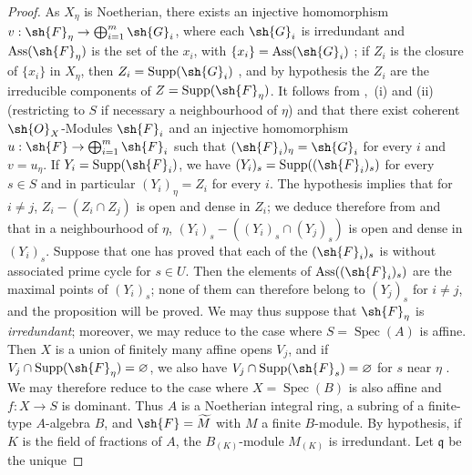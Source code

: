 \begin{proof}
As $X_\eta$ is Noetherian, there exists an injective homomorphism $v:\sh{F}_\eta\to\bigoplus_{i=1}^m\sh{G}_i$, where each $\sh{G}_i$ is irredundant and $\operatorname{Ass}(\sh{F}_\eta)$ is the set of the $x_i$, with $\{x_i\}=\operatorname{Ass}(\sh{G}_i)$ ; if $Z_i$ is the closure of $\{x_i\}$ in $X_\eta$, then $Z_i=\operatorname{Supp}(\sh{G}_i)$ , and by hypothesis the $Z_i$ are the irreducible components of $Z=\operatorname{Supp}(\sh{F}_\eta)$.
It follows from ,~(i) and (ii) (restricting to $S$ if necessary a neighbourhood of $\eta$) and  that there exist coherent $\sh{O}_X$-Modules $\sh{F}_i$ and an injective homomorphism $u:\sh{F}\to\bigoplus_{i=1}^m\sh{F}_i$ such that $(\sh{F}_i)_\eta=\sh{G}_i$ for every $i$ and $v=u_\eta$.
If $Y_i=\operatorname{Supp}(\sh{F}_i)$, we have $(Y_i)_s=\operatorname{Supp}((\sh{F}_i)_s)$ for every $s\in S$  and in particular $(Y_i)_\eta=Z_i$ for every $i$.
The hypothesis implies that for $i\neq j$, $Z_i-(Z_i\cap Z_j)$ is open and dense in $Z_i$; we deduce therefore from  and  that in a neighbourhood of $\eta$, $(Y_i)_s-((Y_i)_s\cap(Y_j)_s)$ is open and dense in $(Y_i)_s$.
Suppose that one has proved that each of the $(\sh{F}_i)_s$ is without associated prime cycle for $s\in U$.
Then the elements of $\operatorname{Ass}((\sh{F}_i)_s)$ are the maximal points of $(Y_i)_s$; none of them can therefore belong to $(Y_j)_s$ for $i\neq j$, and the proposition will be proved. We may thus suppose that $\sh{F}_\eta$ is \emph{irredundant}; moreover, we may reduce to the case where $S=\operatorname{Spec}(A)$ is affine. Then $X$ is a union of finitely many affine opens $V_j$, and if $V_j\cap\operatorname{Supp}(\sh{F}_\eta)=\varnothing$, we also have $V_j\cap\operatorname{Supp}(\sh{F}_s)=\varnothing$ for $s$ near $\eta$ . We may therefore reduce to the case where $X=\operatorname{Spec}(B)$ is also affine and $f:X\to S$ is dominant. Thus $A$ is a Noetherian integral ring, a subring of a finite-type $A$-algebra $B$, and $\sh{F}=\widetilde{M}$ with $M$ a finite $B$-module. By hypothesis, if $K$ is the field of fractions of $A$, the $B_{(K)}$-module $M_{(K)}$ is irredundant.
Let $\mathfrak{q}$ be the unique



\end{proof}
